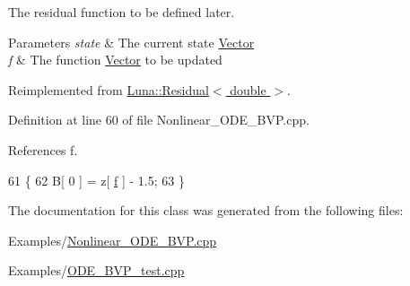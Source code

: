 The residual function to be defined later. 


\begin{DoxyParams}{Parameters}
{\em state} & The current state \hyperlink{classLuna_1_1Vector}{Vector} \\
\hline
{\em f} & The function \hyperlink{classLuna_1_1Vector}{Vector} to be updated \\
\hline
\end{DoxyParams}


Reimplemented from \hyperlink{classLuna_1_1Residual_ae1b1ebe3314c788b176bcac7b328de5c}{Luna\+::\+Residual$<$ double $>$}.



Definition at line 60 of file Nonlinear\+\_\+\+O\+D\+E\+\_\+\+B\+V\+P.\+cpp.



References f.


\begin{DoxyCode}
61         \{
62             B[ 0 ] = z[ \hyperlink{Nonlinear__ODE__BVP_8cpp_a06fc87d81c62e9abb8790b6e5713c55ba7ce756344023b99e5ab27b804feb765c}{f} ] - 1.5;
63         \}
\end{DoxyCode}


The documentation for this class was generated from the following files\+:\begin{DoxyCompactItemize}
\item 
Examples/\hyperlink{Nonlinear__ODE__BVP_8cpp}{Nonlinear\+\_\+\+O\+D\+E\+\_\+\+B\+V\+P.\+cpp}\item 
Examples/\hyperlink{ODE__BVP__test_8cpp}{O\+D\+E\+\_\+\+B\+V\+P\+\_\+test.\+cpp}\end{DoxyCompactItemize}
